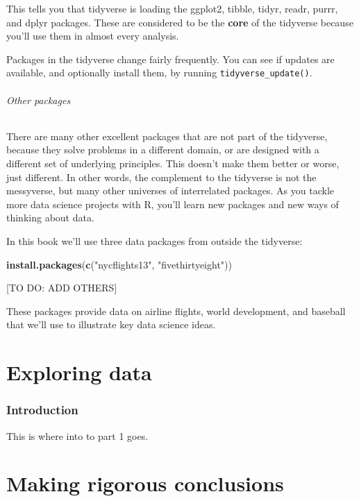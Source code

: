 \documentclass[]{article}
\newenvironment{Shaded}{\begin{snugshade}}{\end{snugshade}}
\newcommand{\KeywordTok}[1]{\textcolor[rgb]{0.13,0.29,0.53}{\textbf{#1}}}
\newcommand{\StringTok}[1]{\textcolor[rgb]{0.31,0.60,0.02}{#1}}
\newcommand{\NormalTok}[1]{#1}
\let\oldparagraph\paragraph
\renewcommand{\paragraph}[1]{\oldparagraph{#1}\mbox{}}
\begin{document}
This tells you that tidyverse is loading the ggplot2, tibble, tidyr,
readr, purrr, and dplyr packages. These are considered to be the
\textbf{core} of the tidyverse because you'll use them in almost every
analysis.

Packages in the tidyverse change fairly frequently. You can see if
updates are available, and optionally install them, by running
\texttt{tidyverse\_update()}.

\paragraph{Other packages}\label{other-packages}

There are many other excellent packages that are not part of the
tidyverse, because they solve problems in a different domain, or are
designed with a different set of underlying principles. This doesn't
make them better or worse, just different. In other words, the
complement to the tidyverse is not the messyverse, but many other
universes of interrelated packages. As you tackle more data science
projects with R, you'll learn new packages and new ways of thinking
about data.

In this book we'll use three data packages from outside the tidyverse:

\begin{Shaded}
\begin{Highlighting}[]
\KeywordTok{install.packages}\NormalTok{(}\KeywordTok{c}\NormalTok{(}\StringTok{"nycflights13"}\NormalTok{, }\StringTok{"fivethirtyeight"}\NormalTok{))}
\end{Highlighting}
\end{Shaded}

{[}TO DO: ADD OTHERS{]}

These packages provide data on airline flights, world development, and
baseball that we'll use to illustrate key data science ideas.

\part{Exploring data}\label{part-exploring-data}

\section{Introduction}\label{explore-intro}

This is where into to part 1 goes.

\part{Making rigorous
conclusions}\label{part-making-rigorous-conclusions}
\end{document}
